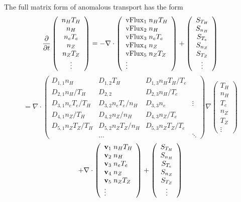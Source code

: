 The full matrix form of anomalous transport has the form
$$ \frac{\partial}{\partial t}
 \left( \begin{array}{c} n_H T_H  \\ n_H \\ n_e T_e \\
    n_Z \\ n_Z T_Z \\ \vdots
    \end{array} \right)
 = - \nabla \cdot
\left( \begin{array}{l} {\rm vFlux}_1 \; n_H T_H \\
 {\rm vFlux}_2 \; n_H \\
 {\rm vFlux}_3 \; n_e T_e \\
 {\rm vFlux}_4 \; n_Z \\
 {\rm vFlux}_5 \; n_Z T_Z \\
 \vdots \end{array} \right) 
 + \left( \begin{array}{c} S_{T_H} \\ S_{n_H} \\ S_{T_e} \\
    S_{n_Z} \\ S_{T_Z} \\ \vdots
    \end{array} \right)
$$
$$
 = \nabla \cdot
\left( \begin{array}{llll}
D_{1,1} n_H & D_{1,2} T_H & D_{1,3} n_H T_H / T_e \\
D_{2,1} n_H / T_H & D_{2,2} & D_{2,3} n_H / T_e \\
D_{3,1} n_e T_e / T_H & D_{3,2} n_e T_e / n_H & D_{3,3} n_e & \vdots \\
D_{4,1} n_Z / T_H & D_{4,2} n_Z / n_H & D_{4,3} n_Z / T_e \\
D_{5,1} n_Z T_Z / T_H & D_{5,2} n_Z T_Z / n_H &
        D_{5,3} n_Z T_Z / T_e \\
 & \ldots & & \ddots
\end{array} \right)
 \nabla
 \left( \begin{array}{c}  T_H \\ n_H \\  T_e \\
   n_Z \\  T_Z \\ \vdots
    \end{array} \right)
$$
$$
 + \nabla \cdot
\left( \begin{array}{l} {\bf v}_1 \; n_H T_H \\ {\bf v}_2 \; n_H \\
   {\bf v}_3 \; n_e T_e \\
   {\bf v}_4 \; n_Z \\ {\bf v}_5 \; n_Z T_Z \\
    \vdots \end{array} \right) +
 \left( \begin{array}{c} S_{T_H} \\ S_{n_H} \\ S_{T_e} \\
    S_{n_Z} \\ S_{T_Z} \\ \vdots
    \end{array} \right) $$
